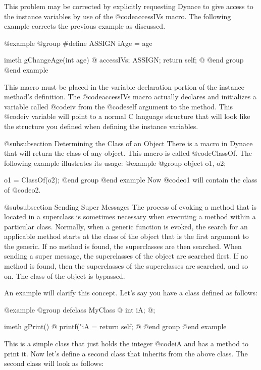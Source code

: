 This problem may be corrected by explicitly requesting Dynace to give
access to the instance variables by use of the @code{accessIVs} macro.
The following example corrects the previous example as discussed.

@example
@group
#define ASSIGN  iAge = age

imeth   gChangeAge(int age)
@{
        accessIVs;
        ASSIGN;
        return self;
@}
@end group
@end example

This macro must be placed in the variable declaration portion of the
instance method's definition.  The @code{accessIVs} macro actually declares
and initializes a variable called @code{iv} from the @code{self} argument
to the method.  This @code{iv} variable will point to a normal C language
structure that will look like the structure you defined when defining
the instance variables.



@subsubsection Determining the Class of an Object
There is a macro in Dynace that will return the class of any object.  This
macro is called @code{ClassOf}.  The following example illustrates its usage:
@example
@group
        object  o1, o2;

        o1 = ClassOf(o2);
@end group
@end example
Now @code{o1} will contain the class of @code{o2}.

@subsubsection Sending Super Messages
The process of evoking a method that is located in a superclass is
sometimes necessary when executing a method within a particular class.
Normally, when a generic function is evoked, the search for an applicable
method starts at the class of the object that is the first argument to
the generic.  If no method is found, the superclasses are then
searched.  When sending a super message, the superclasses of the object
are searched first.  If no method is found, then the superclasses of the
superclasses are searched, and so on.  The class of the object is bypassed.

An example will clarify this concept.  Let's say you have a class defined
as follows:

@example
@group
defclass  MyClass  @{
        int     iA;
@};

imeth   gPrint()
@{
        printf("iA = %
        return self;
@}
@end group
@end example

This is a simple class that just holds the integer @code{iA} and has
a method to print it.  Now let's define a second class that inherits
from the above class.  The second class will look as follows:

